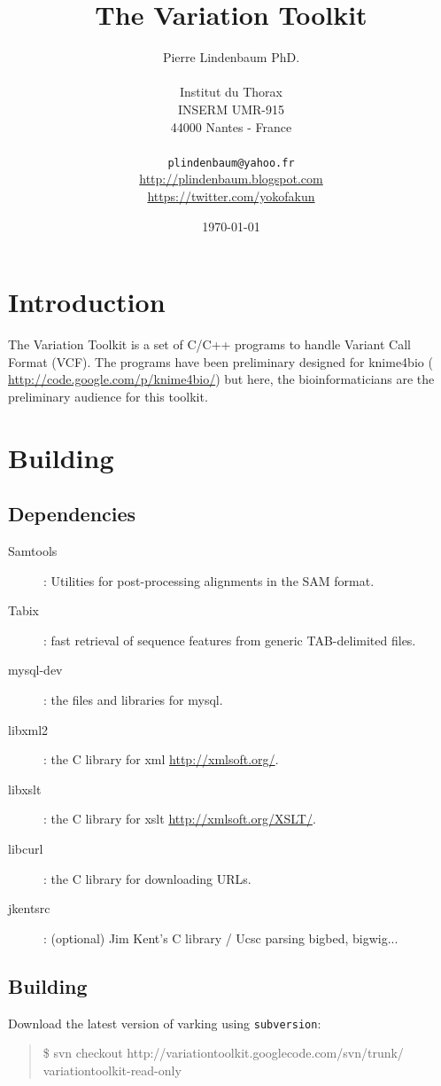 \documentclass[12pt]{article}
\title{The Variation Toolkit}
\author{Pierre Lindenbaum PhD.
\\
\\Institut du Thorax\\INSERM UMR-915\\44000 Nantes - France\\
\\
\texttt{plindenbaum@yahoo.fr}\\ \url{http://plindenbaum.blogspot.com}\\ \url{https://twitter.com/yokofakun}
\\
}
\date{\today}
\begin{document}
\maketitle

\cleardoublepage
\section{Introduction}
The Variation Toolkit is a set of C/C++ programs to handle Variant Call Format (VCF).
The programs have been preliminary designed for knime4bio ( \url{http://code.google.com/p/knime4bio/}) \cite{pmid21984761}
but here, the bioinformaticians are the preliminary audience for this toolkit.
\section{Building}
\subsection{Dependencies}
\begin{description}
\item[Samtools]: Utilities for post-processing alignments in the SAM format. \cite{pmid19505943}
\item[Tabix]: fast retrieval of sequence features from generic TAB-delimited files. \cite{pmid21208982}
\item[mysql-dev]: the files and libraries for mysql.
\item[libxml2]: the C library for xml \url{http://xmlsoft.org/}.
\item[libxslt]: the C library for xslt \url{http://xmlsoft.org/XSLT/}.
\item[libcurl]: the C library for downloading URLs.
\item[jkentsrc]: (optional) Jim Kent's C library / Ucsc parsing bigbed, bigwig...
\end{description}
\subsection{Building}
Download the latest version of varking using \texttt{subversion}:

\begin{quote}
\$ svn checkout http://variationtoolkit.googlecode.com/svn/trunk/ variationtoolkit-read-only
\end{quote}
\end{document}
